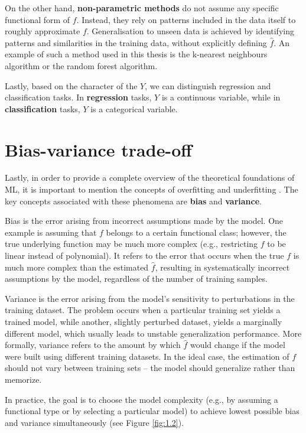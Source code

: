 On the other hand, \textbf{non-parametric methods} do not assume any specific functional form of $f$. Instead, they rely on patterns included in the data itself to roughly approximate $f$. Generalisation to unseen data
is achieved by identifying patterns and similarities in the training data, without explicitly defining $\hat{f}$. An example of such a method used in this thesis is the k-nearest neighbours algorithm or the random forest algorithm.

Lastly, based on the character of the $Y$, we can distinguish regression and classification tasks. In \textbf{regression} tasks, $Y$ is a continuous variable, while in \textbf{classification} tasks, $Y$ is a categorical variable.

\section{Bias-variance trade-off}
Lastly, in order to provide a complete overview of the theoretical foundations of ML, it is important to mention the concepts of overfitting and underfitting \cite{skiena}. 
The key concepts associated with these phenomena are \textbf{bias} and \textbf{variance}. 

Bias is the error arising from incorrect assumptions made by the model. 
One example is assuming that $f$ belongs to a certain functional class; however, the true underlying function may be much more complex (e.g., restricting $f$ to be linear instead of polynomial).
It refers to the error that occurs when the true $f$ is much more complex than the estimated $\hat{f}$, resulting in systematically incorrect assumptions by the model, regardless of the number of training samples. 

Variance is the error arising from the model's sensitivity to perturbations in the training dataset. The problem occurs when a particular training set yields a trained model, while another, slightly perturbed dataset,
yields a marginally different model, which usually leads to unstable generalization performance. 
More formally, variance refers to the amount by which $\hat{f}$ would change if the model were built using different training datasets. In the ideal case, the estimation of $f$ should not vary between training sets – the model should generalize rather than memorize.

In practice, the goal is to choose the model complexity (e.g., by assuming a functional type or by selecting a particular model) to achieve lowest possible bias and variance simultaneously (see Figure \ref{fig:1.2}). 

